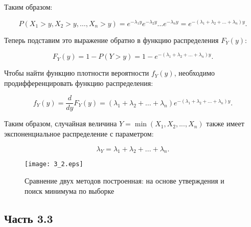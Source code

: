 \documentclass[11pt]{article}
\begin{document}
Таким образом:

$$
P(X_1 > y, X_2 > y, \ldots, X_n > y) = e^{-\lambda_1 y} e^{-\lambda_2 y} \ldots e^{-\lambda_n y} = e^{-(\lambda_1 + \lambda_2 + \ldots + \lambda_n)y}.
$$


Теперь подставим это выражение обратно в функцию распределения $F_Y(y)$:

$$
F_Y(y) = 1 - P(Y > y) = 1 - e^{-(\lambda_1 + \lambda_2 + \ldots + \lambda_n)y}.
$$


Чтобы найти функцию плотности вероятности $f_Y(y)$, необходимо продифференцировать функцию распределения:

$$
f_Y(y) = \frac{d}{dy} F_Y(y) = (\lambda_1 + \lambda_2 + \ldots + \lambda_n)e^{-(\lambda_1 + \lambda_2 + \ldots + \lambda_n)y}.
$$


Таким образом, случайная величина $Y = \min(X_1, X_2, ..., X_n)$ также имеет экспоненциальное распределение с параметром:

$$
\lambda_Y = \lambda_1 + \lambda_2 + ... + \lambda_n.
$$

\begin{figure}[ht]
    \texttt{[image: 3\_2.eps]} 
    \caption{Сравнение двух методов построенная: на основе утверждения и поиск минимума по выборке}
\end{figure} 
\FloatBarrier

\subsection{Часть 3.3}
\end{document}
